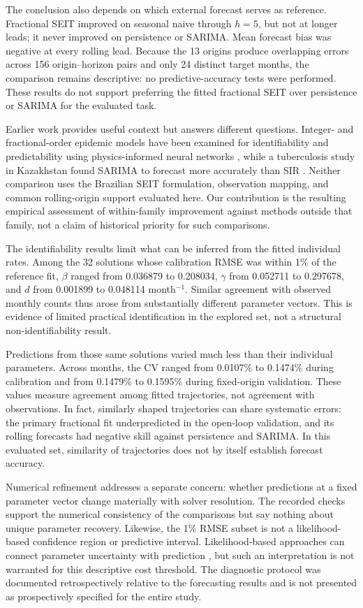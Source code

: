 \documentclass[pdflatex,sn-mathphys-ay]{sn-jnl}
\begin{document}
The conclusion also depends on which external forecast serves as reference. Fractional SEIT improved on seasonal naive through $h=5$, but not at longer leads; it never improved on persistence or SARIMA. Mean forecast bias was negative at every rolling lead. Because the 13 origins produce overlapping errors across 156 origin--horizon pairs and only 24 distinct target months, the comparison remains descriptive: no predictive-accuracy tests were performed. These results do not support preferring the fitted fractional SEIT over persistence or SARIMA for the evaluated task.

Earlier work provides useful context but answers different questions. Integer- and fractional-order epidemic models have been examined for identifiability and predictability using physics-informed neural networks \citep{kharazmi2021}, while a tuberculosis study in Kazakhstan found SARIMA to forecast more accurately than SIR \citep{kalizhanova2024}. Neither comparison uses the Brazilian SEIT formulation, observation mapping, and common rolling-origin support evaluated here. Our contribution is the resulting empirical assessment of within-family improvement against methods outside that family, not a claim of historical priority for such comparisons.

The identifiability results limit what can be inferred from the fitted individual rates. Among the 32 solutions whose calibration RMSE was within 1\% of the reference fit, $\beta$ ranged from 0.036879 to 0.208034, $\gamma$ from 0.052711 to 0.297678, and $d$ from 0.001899 to 0.048114 month$^{-1}$. Similar agreement with observed monthly counts thus arose from substantially different parameter vectors. This is evidence of limited practical identification in the explored set, not a structural non-identifiability result.

Predictions from those same solutions varied much less than their individual parameters. Across months, the CV ranged from 0.0107\% to 0.1474\% during calibration and from 0.1479\% to 0.1595\% during fixed-origin validation. These values measure agreement among fitted trajectories, not agreement with observations. In fact, similarly shaped trajectories can share systematic errors: the primary fractional fit underpredicted in the open-loop validation, and its rolling forecasts had negative skill against persistence and SARIMA. In this evaluated set, similarity of trajectories does not by itself establish forecast accuracy.

Numerical refinement addresses a separate concern: whether predictions at a fixed parameter vector change materially with solver resolution. The recorded checks support the numerical consistency of the comparisons but say nothing about unique parameter recovery. Likewise, the 1\% RMSE subset is not a likelihood-based confidence region or predictive interval. Likelihood-based approaches can connect parameter uncertainty with prediction \citep{simpson2024}, but such an interpretation is not warranted for this descriptive cost threshold. The diagnostic protocol was documented retrospectively relative to the forecasting results and is not presented as prospectively specified for the entire study.
\end{document}
